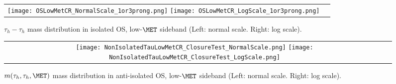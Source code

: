 \begin{table}[!htpb]
   \caption{ Yields in the controls region 1(B) and 1(D) used for calculation of OS/LS ratio.}
   \label{table:OLSStable} %
 \end{table}
  
\begin{figure}[tbhp!]
      \centering
      \begin{tabular}{cc}
        \texttt{[image: OSLowMetCR\_NormalScale\_1or3prong.png]}
        \texttt{[image: OSLowMetCR\_LogScale\_1or3prong.png]}
      \end{tabular}
     \caption{$\tau_{h} - \tau_{h}$ mass distribution in isolated OS, low-$\MET$ sideband (Left: normal scale.  Right: log scale).}
    \label{fig:MG304}
 \end{figure}
\begin{figure}[tbhp!]
      \centering
      \begin{tabular}{cc}
        \texttt{[image: NonIsolatedTauLowMetCR\_ClosureTest\_NormalScale.png]}
        \texttt{[image: NonIsolatedTauLowMetCR\_ClosureTest\_LogScale.png]}
      \end{tabular}
     \caption{$m(\tau_{h},\tau_{h},\MET)$ mass distribution in anti-isolated OS, low-$\MET$ sideband (Left: normal scale.  Right: log scale).}
    \label{fig:MG305}
 \end{figure}


